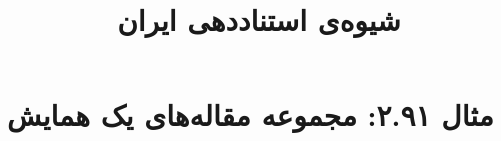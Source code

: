 \documentclass[a4paper,10pt]{article}
\begin{document}
\title{شیوه‌ی استناددهی ایران
 }
\author{}
\date{}
\maketitle



\section*{مثال ۲.۹۱: مجموعه مقاله‌های یک همایش}

\cite{trapani2023}\\






\end{document}
